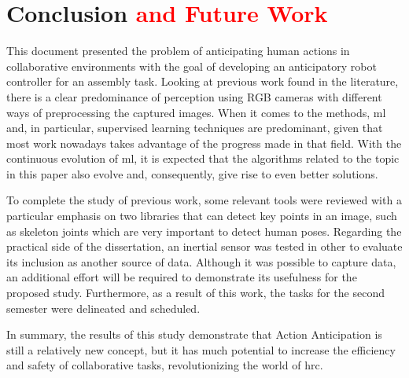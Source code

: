 \chapter{Conclusion \textcolor{red}{and Future Work}}
\label{chapter:conclusion}

This document presented the problem of anticipating human actions in collaborative environments with the goal of developing an anticipatory robot controller for an assembly task. Looking at previous work found in the literature, there is a clear predominance of perception using RGB cameras with different ways of preprocessing the captured images. When it comes to the methods, \acl{ml} and, in particular, supervised learning techniques are predominant, given that most work nowadays takes advantage of the progress made in that field. With the continuous evolution of \acs{ml}, it is expected that the algorithms related to the topic in this paper also evolve and, consequently, give rise to even better solutions. 

To complete the study of previous work, some relevant tools were reviewed with a particular emphasis on two libraries that can detect key points in an image, such as skeleton joints which are very important to detect human poses. Regarding the practical side of the dissertation, an inertial sensor was tested in other to evaluate its inclusion as another source of data. Although it was possible to capture data, an additional effort will be required to demonstrate its usefulness for the proposed study. Furthermore, as a result of this work, the tasks for the second semester were delineated and scheduled.

In summary, the results of this study demonstrate that Action Anticipation is still a relatively new concept, but it has much potential to increase the efficiency and safety of collaborative tasks, revolutionizing the world of \acl{hrc}.